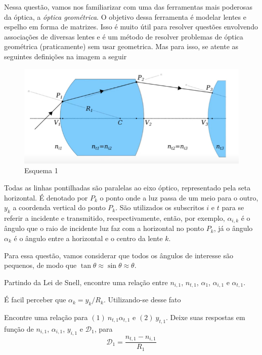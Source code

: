 \documentclass[11pt]{article}
\begin{document}
    \begin{pproblem}
        Nessa questão, vamos nos familiarizar com uma das ferramentas mais poderosas da óptica, a \textit{óptica geométrica}. O objetivo dessa ferramenta é modelar lentes e espelho em forma de matrizes. Isso é muito útil para resolver questões envolvendo associações de diversas lentes e é um método de resolver problemas de óptica geométrica (praticamente) sem usar geometrica. Mas para isso, se atente as seguintes definições na imagem a seguir

        \begin{figure}[H]
            \centering
            \includegraphics[width=0.9\linewidth]{imagens/lentes1.png}
            \caption{Esquema 1}
        \end{figure}

        Todas as linhas pontilhadas são paralelas ao eixo óptico, representado pela seta horizontal. É denotado por \(P_k\) o ponto onde a luz passa de um meio para o outro, \(y_k\) a coordenda vertical do ponto \(P_k\). São utilizados os subscritos \(i\) e \(t\) para se referir a incidente e transmitido, reespectivamente, então, por exemplo, \(\alpha_{i,k}\) é o ângulo que o raio de incidente luz faz com a horizontal no ponto \(P_k\), já o ângulo \(\alpha_k\) é o ângulo entre a horizontal e o centro da lente \(k\).
        

        Para essa questão, vamos considerar que todos os ângulos de interesse são pequenos, de modo que \(\tan\theta \approx \sin\theta \approx \theta\).
        \begin{alternativas}
            \item Partindo da Lei de Snell, encontre uma relação entre \(n_{i,1}\), \(n_{t,1}\), \(\alpha_1\), \(\alpha_{i,1}\) e \(\alpha_{t,1}\).
        
        É facil perceber que \(\alpha_k = y_k/R_k\). Utilizando-se desse fato

            \item Encontre uma relação para \((1) \ n_{t,1}\alpha_{t,1}\) e \((2) \ y_{t,1}\). Deixe suas respostas em função de \(n_{i,1}\), \(\alpha_{i,1}\), \(y_{i,1}\) e \(\mathcal{D}_1\), para
            \[\mathcal{D}_1 = \frac{n_{t,1}-n_{i,1}}{R_1}\]


\end{alternativas}
\end{pproblem}
\end{document}
